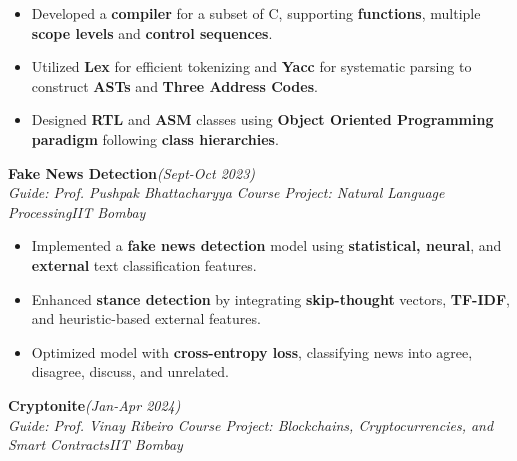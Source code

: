 \documentclass[10pt]{article}
\begin{document}
		\begin{itemize}[itemsep = -0.8 mm, leftmargin=*]
		\vspace{-16pt}
  \item  Developed a \textbf{compiler} for a subset of C, supporting \textbf{functions}, multiple \textbf{scope levels} and \textbf{control sequences}.
\item Utilized \textbf{Lex} for efficient tokenizing and \textbf{Yacc} for systematic parsing to construct \textbf{ASTs} and \textbf{Three Address Codes}.
\item Designed \textbf{RTL} and \textbf{ASM} classes using \textbf{Object Oriented Programming paradigm} following \textbf{class hierarchies}.
	\end{itemize}
\vspace{-6pt}
{\selectfont
		\textbf{{Fake News Detection}}\hfill{\sl \small (Sept-Oct 2023)}\\
	}{\it Guide: Prof. Pushpak Bhattacharyya \textbar} {\it Course Project: Natural Language Processing}\hfill{\sl \small IIT Bombay}\\

		\begin{itemize}[itemsep = -0.8 mm, leftmargin=*]
		\vspace{-16pt}
      \item Implemented a \textbf{fake news detection} model using \textbf{statistical, neural}, and \textbf{external} text classification features.
      \item Enhanced \textbf{stance detection} by integrating \textbf{skip-thought} vectors, \textbf{TF-IDF}, and heuristic-based external features.
      \item Optimized model with \textbf{cross-entropy loss}, classifying news into agree, disagree, discuss, and unrelated.
	\end{itemize}
\vspace{-6pt}
{\selectfont
		\textbf{{Cryptonite}}\hfill{\sl \small (Jan-Apr 2024)}\\
	}{\it Guide: Prof. Vinay Ribeiro \textbar} {\it Course Project: Blockchains, Cryptocurrencies, and Smart Contracts}\hfill{\sl \small IIT Bombay}\\
\end{document}
